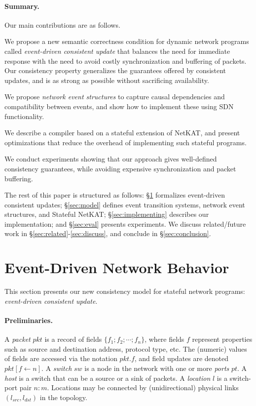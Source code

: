 \documentclass[pldi-cameraready]{sigplanconf}
\newcommand*\xmnote[3][0pt]{}
\newcommand{\switch}{\ensuremath{\mathit{sw}}}
\newcommand{\pt}{\ensuremath{\mathit{pt}}}
\newcommand{\pkt}{\ensuremath{\mathit{pkt}}}
\begin{document}
\paragraph{Summary.}  
Our main contributions are as follows.
\begin{compactitem}
\item We propose a new semantic correctness condition for dynamic network programs called
  \emph{event-driven consistent update} that balances the need for
  immediate response with the need to avoid costly synchronization and
  buffering of packets.
Our consistency property
\xmnote{\FiveStar}{Q7}generalizes the guarantees offered by consistent updates, and
is as strong as possible without sacrificing availability.
\item We propose \emph{network event structures} to capture causal dependencies and compatibility
  between events, and show how to implement these using SDN functionality.
\item We describe a compiler based on a stateful extension of
  NetKAT, and present optimizations that reduce the overhead of
  implementing such stateful programs.
\item We conduct experiments showing that our approach gives
  well-defined consistency guarantees, while avoiding expensive
  synchronization and packet buffering.
\end{compactitem}

\vspace{2pt}
\noindent
The rest of this paper is structured as follows:
\S\ref{sec:consistency} formalizes event-driven consistent updates;
\S\ref{sec:model} defines event transition systems, network event
structures, and Stateful NetKAT; \S\ref{sec:implementing} describes
our implementation; and \S\ref{sec:eval} presents experiments.
We discuss related/future work in \S\ref{sec:related}-\ref{sec:discuss},
and conclude in \S\ref{sec:conclusion}.

\section{Event-Driven Network Behavior}
\label{sec:consistency}



This section presents our new consistency model for stateful network
programs: {\em event-driven consistent update}.

\paragraph*{Preliminaries.}
A {\em packet} $\pkt$ is a record of fields $\{f_1; f_2;\allowbreak \cdots;\allowbreak f_n\}$,
where fields $f$ represent properties such as source and
destination address, protocol type, etc. The (numeric) values of fields
are accessed via the notation $\pkt.f$, and field updates are denoted $\pkt[f \gets n]$.
A {\em switch}
$\switch$ is a node in the network with one or more {\em ports}
$\pt$. A {\em host} is a switch that can be a source or a sink of
packets. A {\em location} $l$ is a switch-port pair $n{:}m$. Locations may
be connected by (unidirectional) physical links $(l_{src},l_{dst})$ in the topology.
\end{document}
